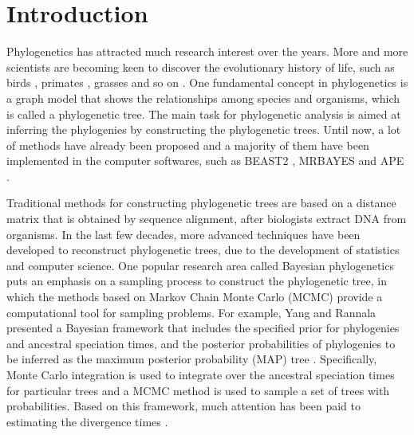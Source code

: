\documentclass{bmcart}
\begin{document}
\section*{Introduction}
Phylogenetics has attracted much research interest over the years. More and more scientists are becoming keen to discover the evolutionary history of life, such as birds \cite{hackett2008phylogenomic}, primates \cite{szalay2013evolutionary}, grasses \cite{kellogg2001evolutionary} and so on \cite{sawabe2007inferring,garnery1992evolutionary}. One fundamental concept in phylogenetics is a graph model that shows the relationships among species and organisms, which is called a phylogenetic tree. The main task for phylogenetic analysis is aimed at inferring the phylogenies by constructing the phylogenetic trees. Until now, a lot of methods have already been proposed and a majority of them have been implemented in the computer softwares, such as BEAST2 \cite{drummond2007beast, bouckaert2014beast} , MRBAYES \cite{huelsenbeck2001mrbayes} and APE \cite{paradis2004ape}.

Traditional methods for constructing phylogenetic trees are based on a distance matrix that is obtained by sequence alignment, after biologists extract DNA from organisms. In the last few decades, more advanced techniques have been developed to reconstruct phylogenetic trees, due to the development of statistics and computer science. One popular research area called Bayesian phylogenetics puts an emphasis on a sampling process to construct the phylogenetic tree, in which the methods based on Markov Chain Monte Carlo (MCMC) provide a computational tool for sampling problems. For example, Yang and Rannala presented a Bayesian framework that includes the specified prior for phylogenies and ancestral speciation times, and the posterior probabilities of phylogenies to be inferred as the maximum posterior probability (MAP) tree \cite{yang1997bayesian}. Specifically, Monte Carlo integration is used to integrate over the ancestral speciation times for particular trees and a MCMC method is used to sample a set of trees with probabilities. Based on this framework, much attention has been paid to estimating the divergence times \cite{rannala2003bayes,yang2003comparison,reis2011approximate}.
\end{document}
